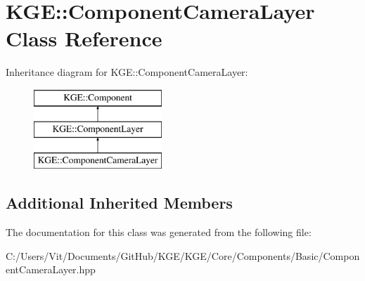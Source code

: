 \hypertarget{class_k_g_e_1_1_component_camera_layer}{\section{K\-G\-E\-:\-:Component\-Camera\-Layer Class Reference}
\label{class_k_g_e_1_1_component_camera_layer}
}
Inheritance diagram for K\-G\-E\-:\-:Component\-Camera\-Layer\-:\begin{figure}[H]
\begin{center}
\leavevmode
\includegraphics[height=3.000000cm]{class_k_g_e_1_1_component_camera_layer}
\end{center}
\end{figure}
\subsection*{Additional Inherited Members}


The documentation for this class was generated from the following file\-:\begin{DoxyCompactItemize}
\item 
C\-:/\-Users/\-Vit/\-Documents/\-Git\-Hub/\-K\-G\-E/\-K\-G\-E/\-Core/\-Components/\-Basic/Component\-Camera\-Layer.\-hpp\end{DoxyCompactItemize}
